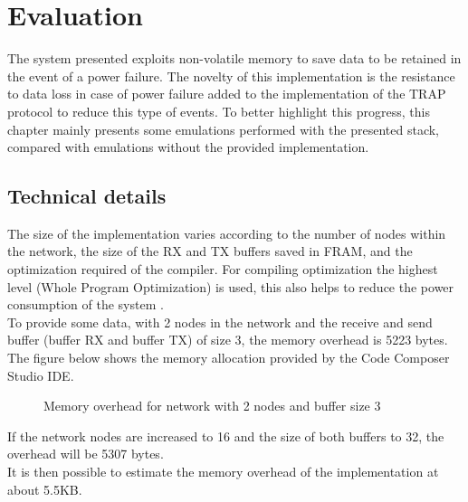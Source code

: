 \chapter{Evaluation}
The system presented exploits non-volatile memory to save data to be retained in the event of a power failure. The novelty of this implementation is the resistance to data loss in case of power failure added to the implementation of the TRAP protocol to reduce this type of events. To better highlight this progress, this chapter mainly presents some emulations performed with the presented stack, compared with emulations without the provided implementation.
\label{cha:Evaluation}
\section{Technical details}
\label{sec:Technical deatils}
The size of the implementation varies according to the number of nodes within the network, the size of the RX and TX buffers saved in FRAM, and the optimization required of the compiler. 
For compiling optimization the highest level (Whole Program Optimization) is used, this also helps to reduce the power consumption of the system \cite{OptimizationCompiler}.\\
To provide some data, with 2 nodes in the network and the receive and send buffer (buffer RX and buffer TX) of size 3, the memory overhead is 5223 bytes.\\
The figure below shows the memory allocation provided by the Code Composer Studio IDE.\\
\begin{figure}[H]
\centerline{}
\caption{\footnotesize \centering Memory overhead for network with 2 nodes and buffer size 3}
\label{fig:memoryOverhead}
\end{figure}
If the network nodes are increased to 16 and the size of both buffers to 32, the overhead will be 5307 bytes.\\
It is then possible to estimate the memory overhead of the implementation at about 5.5KB.
